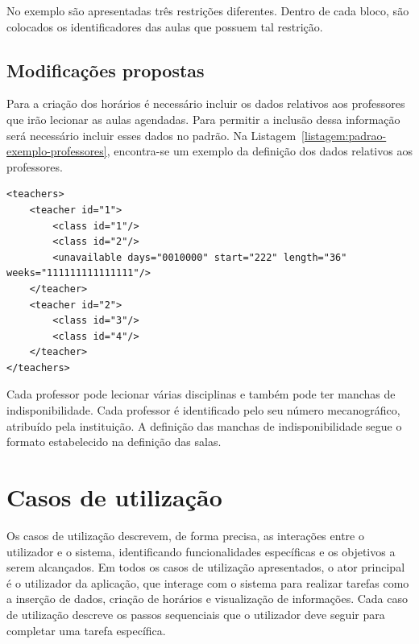 No exemplo são apresentadas três restrições diferentes. Dentro de cada bloco, são colocados os identificadores das aulas que possuem tal restrição.

\subsection{Modificações propostas}

Para a criação dos horários é necessário incluir os dados relativos aos professores que irão lecionar as aulas agendadas. Para permitir a inclusão dessa informação será necessário incluir esses dados no padrão. Na Listagem~\ref{listagem:padrao-exemplo-professores}, encontra-se um exemplo da definição dos dados relativos aos professores.

\begin{minipage}[c]{\linewidth}
\begin{lstlisting}[caption={Exemplo da informação relacionada com os professores.}, label={listagem:padrao-exemplo-professores}]
<teachers>
    <teacher id="1">
        <class id="1"/>
        <class id="2"/>
        <unavailable days="0010000" start="222" length="36" weeks="111111111111111"/>
    </teacher>
    <teacher id="2">
        <class id="3"/>
        <class id="4"/>
    </teacher>
</teachers>
\end{lstlisting}
\end{minipage}

Cada professor pode lecionar várias disciplinas e também pode ter manchas de indisponibilidade. Cada professor é identificado pelo seu número mecanográfico, atribuído pela instituição. A definição das manchas de indisponibilidade segue o formato estabelecido na definição das salas.

\section{Casos de utilização}
\label{capitulo3:Casos-util}

Os casos de utilização descrevem, de forma precisa, as interações entre o utilizador e o sistema, identificando funcionalidades específicas e os objetivos a serem alcançados. Em todos os casos de utilização apresentados, o ator principal é o utilizador da aplicação, que interage com o sistema para realizar tarefas como a inserção de dados, criação de horários e visualização de informações. Cada caso de utilização descreve os passos sequenciais que o utilizador deve seguir para completar uma tarefa específica.

